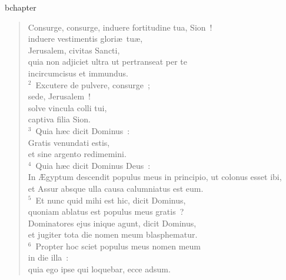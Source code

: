 bchapter\begin{verse}\vspace{-19pt}Consurge, consurge, induere fortitudine tua, Sion~!\\ induere vestimentis glori\ae\ tu\ae ,\\ Jerusalem, civitas Sancti,\\ quia non adjiciet ultra ut pertranseat per te\\ incircumcisus et immundus.\\
${}^{2}$~Excutere de pulvere, consurge~;\\ sede, Jerusalem~!\\ solve vincula colli tui,\\ captiva filia Sion.\\
${}^{3}$~Quia h\ae c dicit Dominus~:\\ Gratis venundati estis,\\ et sine argento redimemini.\\
${}^{4}$~Quia h\ae c dicit Dominus Deus~:\\ In \AE gyptum descendit populus meus in principio, ut colonus esset ibi,\\ et Assur absque ulla causa calumniatus est eum.\\
${}^{5}$~Et nunc quid mihi est hic, dicit Dominus,\\ quoniam ablatus est populus meus gratis~?\\ Dominatores ejus inique agunt, dicit Dominus,\\ et jugiter tota die nomen meum blasphematur.\\
${}^{6}$~Propter hoc sciet populus meus nomen meum\\ in die illa~:\\ quia ego ipse qui loquebar, ecce adsum.\end{verse}


